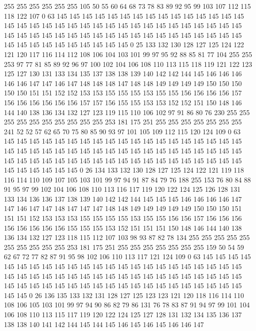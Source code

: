 255 255 255 255 255 255 105 50 55 60 64 68 73 78 83 89 92 95 99 103
107 112 115 118 122 107 0 63 145 145 145 145 145 145 145 145 145 145 145 145
145 145 145 145 145 145 145 145 145 145 145 145 145 145 145 145 145 145 145 145
145 145 145 145 145 145 145 145 145 145 145 145 145 145 145 145 145 145 145 145
145 145 145 145 145 145 145 145 145 145 145 0 25 133 132 130 128 127 125 124
122 121 120 117 116 114 112 108 106 104 103 101 99 97 95 92 88 85 81 77
104 255 255 253 97 77 81 85 89 92 96 97 100 102 104 106 108 110 113 115
118 119 121 122 123 125 127 130 131 133 134 135 137 138 138 139 140 142 142 144
145 146 146 146 146 146 147 147 146 147 148 148 148 147 148 148 149 149 149 149
150 150 150 150 150 151 151 152 152 153 153 155 155 155 153 155 155 156 156 156
156 157 156 156 156 156 156 156 157 157 156 155 155 153 153 152 152 151 150 148
146 144 140 138 136 134 132 127 123 119 115 110 106 102 97 91 86 80 76 230
255 255 255 255 255 255 255 255 255 255 253 181 175 251 255 255 255 255 255 255
255 241 52 52 57 62 65 70 75 80 85 90 93 97 101 105 109 112 115 120
124 109 0 63 145 145 145 145 145 145 145 145 145 145 145 145 145 145 145 145
145 145 145 145 145 145 145 145 145 145 145 145 145 145 145 145 145 145 145 145
145 145 145 145 145 145 145 145 145 145 145 145 145 145 145 145 145 145 145 145
145 145 145 145 145 145 145 0 26 134 133 132 130 128 127 125 124 122 121 119
118 116 114 110 109 107 105 103 101 99 97 94 91 87 84 79 76 188 255 153
76 80 84 88 91 95 97 99 102 104 106 108 110 113 116 117 119 120 122 124
125 126 128 131 133 134 136 136 137 138 139 140 142 142 144 145 145 145 146 146
146 146 147 147 146 147 147 148 147 147 147 148 148 149 149 149 149 149 150 150
150 151 151 151 152 153 153 153 155 155 155 155 153 155 155 156 156 157 156 156
156 156 156 156 156 156 155 155 155 153 152 151 151 151 150 148 146 144 140 138
136 134 132 127 123 118 115 112 107 103 98 93 87 82 78 134 255 255 255 255
255 255 255 255 255 255 253 181 175 251 255 255 255 255 255 255 255 159 50 54
59 62 67 72 77 82 87 91 95 98 102 106 110 113 117 121 124 109 0 63
145 145 145 145 145 145 145 145 145 145 145 145 145 145 145 145 145 145 145 145
145 145 145 145 145 145 145 145 145 145 145 145 145 145 145 145 145 145 145 145
145 145 145 145 145 145 145 145 145 145 145 145 145 145 145 145 145 145 145 145
145 145 145 0 26 136 135 133 132 131 128 127 125 123 123 121 120 118 116 114
110 108 106 105 103 101 99 97 94 90 86 82 79 86 131 76 78 83 87 91
94 97 99 101 104 106 108 110 113 115 117 119 120 122 124 125 127 128 131 132
134 135 136 137 138 138 140 141 142 144 145 144 145 146 145 146 145 146 146 147
